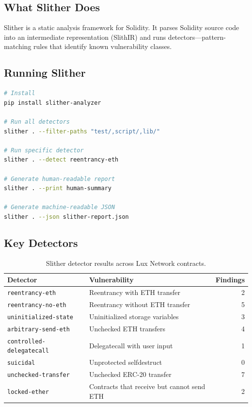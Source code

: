 \documentclass[11pt,a4paper]{article}
\begin{document}
\subsection{What Slither Does}

Slither is a static analysis framework for Solidity. It parses Solidity source code into
an intermediate representation (SlithIR) and runs detectors---pattern-matching rules that
identify known vulnerability classes.

\subsection{Running Slither}

\begin{lstlisting}[language=bash,caption={Running Slither on a Foundry project}]
# Install
pip install slither-analyzer

# Run all detectors
slither . --filter-paths "test/,script/,lib/"

# Run specific detector
slither . --detect reentrancy-eth

# Generate human-readable report
slither . --print human-summary

# Generate machine-readable JSON
slither . --json slither-report.json
\end{lstlisting}

\subsection{Key Detectors}

\begin{table}[H]
\centering
\small
\begin{tabular}{@{}llr@{}}
\toprule
\textbf{Detector} & \textbf{Vulnerability} & \textbf{Findings} \\
\midrule
\texttt{reentrancy-eth} & Reentrancy with ETH transfer & 2 \\
\texttt{reentrancy-no-eth} & Reentrancy without ETH transfer & 5 \\
\texttt{uninitialized-state} & Uninitialized storage variables & 3 \\
\texttt{arbitrary-send-eth} & Unchecked ETH transfers & 4 \\
\texttt{controlled-delegatecall} & Delegatecall with user input & 1 \\
\texttt{suicidal} & Unprotected selfdestruct & 0 \\
\texttt{unchecked-transfer} & Unchecked ERC-20 transfer & 7 \\
\texttt{locked-ether} & Contracts that receive but cannot send ETH & 2 \\
\bottomrule
\end{tabular}
\caption{Slither detector results across Lux Network contracts.}
\end{table}
\end{document}

